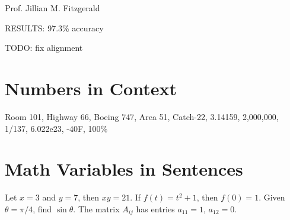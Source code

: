 \documentclass{article}
\begin{document}
Prof. Jillian M. Fitzgerald

RESULTS: 97.3\% accuracy

TODO: fix alignment

\section*{Numbers in Context}

Room 101, Highway 66, Boeing 747, Area 51, Catch-22, 3.14159, 2,000,000, 1/137, 6.022e23, -40F, 100\%

\section*{Math Variables in Sentences}

Let $x = 3$ and $y = 7$, then $xy = 21$. If $f(t) = t^2 + 1$, then $f(0) = 1$. Given $\theta = \pi/4$, find $\sin\theta$. The matrix $A_{ij}$ has entries $a_{11} = 1$, $a_{12} = 0$.
\end{document}
